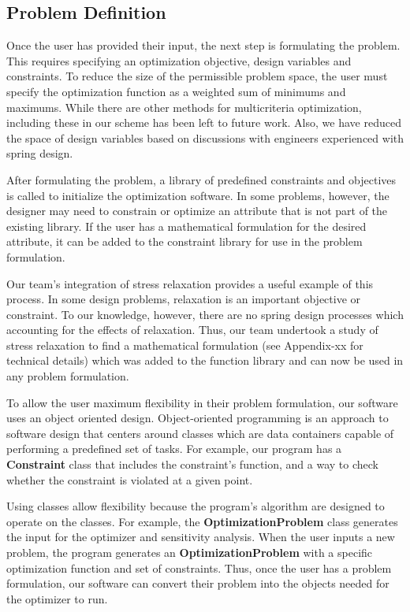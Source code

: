 \documentclass[10pt]{article}
\begin{document}
\subsection{Problem Definition}
\label{sec:Problem_Definition}

Once the user has provided their input, the next step is formulating the problem.  This requires specifying an optimization objective, design variables and constraints.  To reduce the size of the permissible problem space, the user must specify the optimization function as a weighted sum of minimums and maximums.  While there are other methods for multicriteria optimization, including these in our scheme has been left to future work.  Also, we have reduced the space of design variables based on discussions with engineers experienced with spring design.

After formulating the problem, a library of predefined constraints and objectives is called to initialize the optimization software.  In some problems, however, the designer may need to constrain or optimize an attribute that is not part of the existing library.  If the user has a mathematical formulation for the desired attribute, it can be added to the constraint library for use in the problem formulation.

Our team's integration of stress relaxation provides a useful example of this process.  In some design problems, relaxation is an important objective or constraint.  To our knowledge, however, there are no spring design processes which accounting for the effects of relaxation.  Thus, our team undertook a study of stress relaxation to find a mathematical formulation (see Appendix-xx for technical details) which was added to the function library and can now be used in any problem formulation.

To allow the user maximum flexibility in their problem formulation, our software uses an object oriented design.  Object-oriented programming is an approach to software design that centers around classes which are data containers capable of performing a predefined set of tasks.  For example, our program has a \textbf{Constraint} class that includes the constraint's function, and a way to check whether the constraint is violated at a given point.

Using classes allow flexibility because the program's algorithm are designed to operate on the classes.  For example, the \textbf{OptimizationProblem} class generates the input for the optimizer and sensitivity analysis.  When the user inputs a new problem, the program generates an \textbf{OptimizationProblem} with a specific optimization function and set of constraints.  Thus, once the user has a problem formulation, our software can convert their problem into the objects needed for the optimizer to run.
\end{document}
